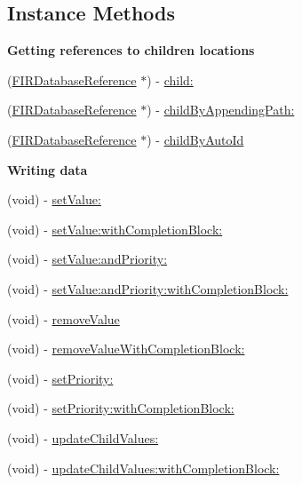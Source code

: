 \subsection*{Instance Methods}
\begin{Indent}{\bf Getting references to children locations}\par
\begin{DoxyCompactItemize}
\item 
(\hyperlink{interface_f_i_r_database_reference}{F\+I\+R\+Database\+Reference} $\ast$) -\/ \hyperlink{interface_f_i_r_database_reference_ab514e36d89ede9ae6146658fee1aec49}{child\+:}
\item 
(\hyperlink{interface_f_i_r_database_reference}{F\+I\+R\+Database\+Reference} $\ast$) -\/ \hyperlink{interface_f_i_r_database_reference_a1f90c17a8e7c76e35d33c34e0d84affc}{child\+By\+Appending\+Path\+:}
\item 
(\hyperlink{interface_f_i_r_database_reference}{F\+I\+R\+Database\+Reference} $\ast$) -\/ \hyperlink{interface_f_i_r_database_reference_a18f449729a922397587a9f0c5e0ab812}{child\+By\+Auto\+Id}
\end{DoxyCompactItemize}
\end{Indent}
\begin{Indent}{\bf Writing data}\par
\begin{DoxyCompactItemize}
\item 
(void) -\/ \hyperlink{interface_f_i_r_database_reference_acf78aa82ff0be1d9e3a379e6e714060d}{set\+Value\+:}
\item 
(void) -\/ \hyperlink{interface_f_i_r_database_reference_a1107cae145ab12e1ef58ab9f8713b84d}{set\+Value\+:with\+Completion\+Block\+:}
\item 
(void) -\/ \hyperlink{interface_f_i_r_database_reference_a8a1b22b8e5aee17298a3b35529df971a}{set\+Value\+:and\+Priority\+:}
\item 
(void) -\/ \hyperlink{interface_f_i_r_database_reference_a156c69fd7db3d3f7b10672831d556945}{set\+Value\+:and\+Priority\+:with\+Completion\+Block\+:}
\item 
(void) -\/ \hyperlink{interface_f_i_r_database_reference_a1e33df6f4770d5268865a65e2b3cf2ad}{remove\+Value}
\item 
(void) -\/ \hyperlink{interface_f_i_r_database_reference_a632d1e84d72d561f76d284177020b672}{remove\+Value\+With\+Completion\+Block\+:}
\item 
(void) -\/ \hyperlink{interface_f_i_r_database_reference_a137281e08179107ae2d575328facf825}{set\+Priority\+:}
\item 
(void) -\/ \hyperlink{interface_f_i_r_database_reference_ae3ca537cf8e8e8f7713b47de4617889a}{set\+Priority\+:with\+Completion\+Block\+:}
\item 
(void) -\/ \hyperlink{interface_f_i_r_database_reference_ad553cea3cbd57e8fc93fd9eb63781166}{update\+Child\+Values\+:}
\item 
(void) -\/ \hyperlink{interface_f_i_r_database_reference_abe8d523a3cdfec8a292eaf7d6176b379}{update\+Child\+Values\+:with\+Completion\+Block\+:}
\end{DoxyCompactItemize}
\end{Indent}
